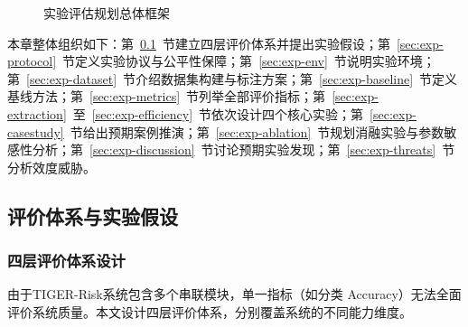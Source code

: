 \documentclass[12pt,a4paper]{article}
\newcommand{\projectshort}{TIGER-Risk}
\begin{document}
\begin{figure}[H]
{
}
\caption{实验评估规划总体框架}
\label{fig:exp-framework}
\end{figure}

本章整体组织如下：第~\ref{sec:exp-framework}~节建立四层评价体系并提出实验假设；第~\ref{sec:exp-protocol}~节定义实验协议与公平性保障；第~\ref{sec:exp-env}~节说明实验环境；第~\ref{sec:exp-dataset}~节介绍数据集构建与标注方案；第~\ref{sec:exp-baseline}~节定义基线方法；第~\ref{sec:exp-metrics}~节列举全部评价指标；第~\ref{sec:exp-extraction}~至~\ref{sec:exp-efficiency}~节依次设计四个核心实验；第~\ref{sec:exp-casestudy}~节给出预期案例推演；第~\ref{sec:exp-ablation}~节规划消融实验与参数敏感性分析；第~\ref{sec:exp-discussion}~节讨论预期实验发现；第~\ref{sec:exp-threats}~节分析效度威胁。

\subsection{评价体系与实验假设}
\label{sec:exp-framework}

\subsubsection{四层评价体系设计}

由于\projectshort 系统包含多个串联模块，单一指标（如分类 Accuracy）无法全面评价系统质量。本文设计四层评价体系，分别覆盖系统的不同能力维度。
\end{document}
